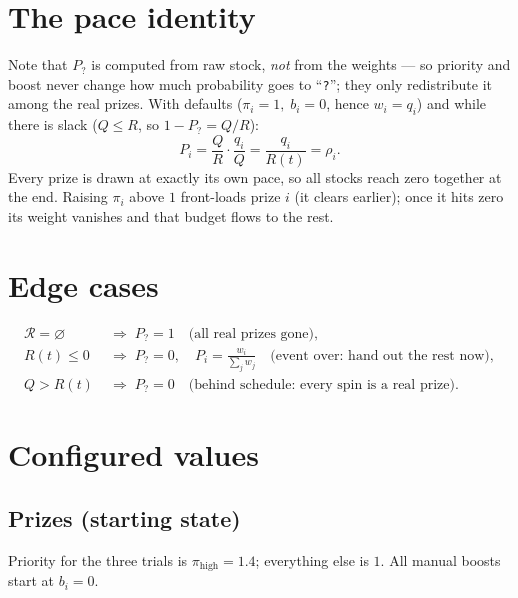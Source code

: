 \documentclass[11pt]{article}
\newcommand{\R}{\mathcal{R}}
\begin{document}
\section{The pace identity}

Note that $P_?$ is computed from raw stock, \emph{not} from the weights --- so
priority and boost never change how much probability goes to ``\texttt{?}'';
they only redistribute it among the real prizes. With defaults
($\pi_i = 1,\; b_i = 0$, hence $w_i = q_i$) and while there is slack
($Q \le R$, so $1-P_? = Q/R$):
\begin{equation}
P_i = \frac{Q}{R}\cdot\frac{q_i}{Q} = \frac{q_i}{R(t)} = \rho_i .
\end{equation}
Every prize is drawn at exactly its own pace, so all stocks reach zero together
at the end. Raising $\pi_i$ above $1$ front-loads prize $i$ (it clears earlier);
once it hits zero its weight vanishes and that budget flows to the rest.

\section{Edge cases}

\begin{align}
\R = \varnothing &\;\Rightarrow\; P_? = 1 \quad\text{(all real prizes gone)},\\
R(t) \le 0 &\;\Rightarrow\; P_? = 0,\quad P_i = \frac{w_i}{\sum_j w_j}
\quad\text{(event over: hand out the rest now)},\\
Q > R(t) &\;\Rightarrow\; P_? = 0 \quad\text{(behind schedule: every spin is a real prize).}
\end{align}

\section{Configured values}

\subsection{Prizes (starting state)}

Priority for the three trials is $\pi_{\text{high}} = 1.4$; everything else is
$1$. All manual boosts start at $b_i = 0$.
\end{document}
